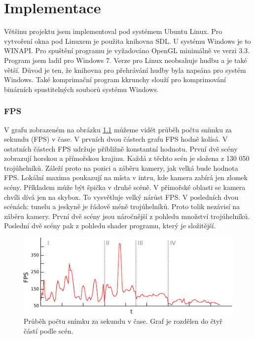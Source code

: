 
\chapter{Implementace}

Většinu projektu jsem implementoval pod systémem Ubuntu Linux.
Pro vytvoření okna pod Linuxem je použita knihovna SDL.
U systému Windows je to WINAPI.
Pro spuštění programu je vyžadováno OpenGL minimálně ve verzi 3.3.
Program jsem ladil pro Windows 7.
Verze pro Linux neobsahuje hudbu a je také větší.
Důvod je ten, že knihovna pro přehrávání hudby byla napsána pro systém Windows.
Také komprimační program kkrunchy slouží pro komprimování binárních spustitelných souborů systému Windows.








\newpage
\subsection{FPS}

V grafu zobrazeném na obrázku \ref{fig:fps} můžeme vidět průběh počtu snímku za sekundu (FPS) v čase.
V prvních dvou částech grafu FPS hodně kolísá.
V ostatních částech FPS udržuje přibližně konstantní hodnotu.
První dvě scény zobrazují horskou a přímořskou krajinu.
Každá z těchto scén je složena z 130 050 trojúhelníků.
Záleží proto na pozici a záběru kamery, jak velká bude hodnota FPS.
Lokální maxima poukazují na místa v intru, kde kamera zabírá jen zlomek scény.
Příkladem může být špička v druhé scéně.
V přímořské oblasti se kamera chvíli dívá jen na skybox. 
To vysvětluje velký nárůst FPS.
V posledních dvou scénách: tunelu a jeskyně je řádově méně trojúhelníků.
Proto tolik nezávisí na záběru kamery.
První dvě scény jsou náročnější z pohledu množství trojúhelníků.
Poslední dvě scény pak z pohledu shader programu, který je složitější.

\begin{figure}[h]
\centering
\includegraphics[width=15cm,keepaspectratio]{obr/fps.pdf}
\caption{Průběh počtu snímku za sekundu v čase.
Graf je rozdělen do čtyř částí podle scén.}
\label{fig:fps}
\end{figure}
